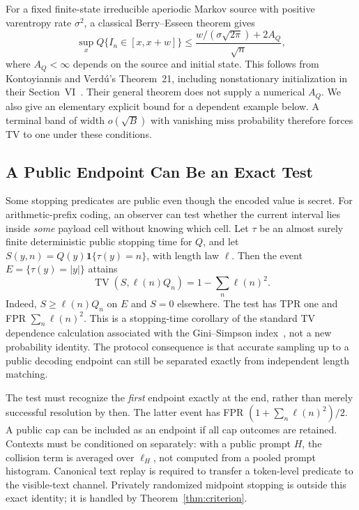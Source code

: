 For a fixed finite-state irreducible aperiodic Markov source with positive
varentropy rate $\sigma^2$, a classical Berry--Esseen theorem gives
\begin{equation}
 \sup_x Q\{I_n\in[x,x+w]\}
 \le\frac{w/(\sigma\sqrt{2\pi})+2A_Q}{\sqrt n},
 \label{eq:markov-anticoncentration}
\end{equation}
where $A_Q<\infty$ depends on the source and initial state. This follows from
Kontoyiannis and Verd\'u's Theorem~21, including nonstationary initialization
in their Section~VI~\cite{kontoyiannis2014lossless}. Their general theorem does
not supply a numerical $A_Q$. We also give an elementary explicit bound for a
dependent example below. A terminal band of width $o(\sqrt B)$ with vanishing
miss probability therefore forces TV to one under these conditions.

\subsection{A Public Endpoint Can Be an Exact Test}
\label{sec:public-endpoint}

Some stopping predicates are public even though the encoded value is secret.
For arithmetic-prefix coding, an observer can test whether the current interval
lies inside \emph{some} payload cell without knowing which cell. Let $\tau$
be an almost surely finite deterministic public stopping time for $Q$, and
let $S(y,n)=Q(y)\mathbf1\{\tau(y)=n\}$, with length law $\ell$.
Then the event $E=\{\tau(y)=|y|\}$ attains
\begin{equation}
 \operatorname{TV}(S,\ell(n)Q_n)
 =1-\sum_n\ell(n)^2.
 \label{eq:endpoint-identity}
\end{equation}
Indeed, $S\ge\ell(n)Q_n$ on $E$ and $S=0$ elsewhere. The test has TPR one and
FPR $\sum_n\ell(n)^2$. This is a stopping-time corollary of the standard
TV dependence calculation associated with the Gini--Simpson
index~\cite{perrone2024entropy}, not a new probability identity. The protocol
consequence is that accurate sampling up to a public decoding endpoint can
still be separated exactly from independent length matching.

The test must recognize the \emph{first} endpoint exactly at the end, rather
than merely successful resolution by then. The latter event has FPR
$(1+\sum_n\ell(n)^2)/2$. A public cap can be included as an endpoint if all cap
outcomes are retained. Contexts must be conditioned on separately: with a
public prompt $H$, the collision term is averaged over $\ell_H$, not computed
from a pooled prompt histogram. Canonical text replay is required to transfer
a token-level predicate to the visible-text channel. Privately randomized
midpoint stopping is outside this exact identity; it is handled by
Theorem~\ref{thm:criterion}.

